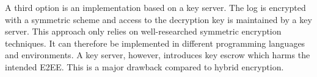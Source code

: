 \documentclass[../main.tex]{subfiles}
\begin{document}
A third option is an implementation based on a key server.
The log is encrypted with a symmetric scheme and access to the decryption key is maintained by a key server.
This approach only relies on well-researched symmetric encryption techniques.
It can therefore be implemented in different programming languages and environments.
A key server, however, introduces key escrow which harms the intended E2EE.
This is a major drawback compared to hybrid encryption.
\end{document}
